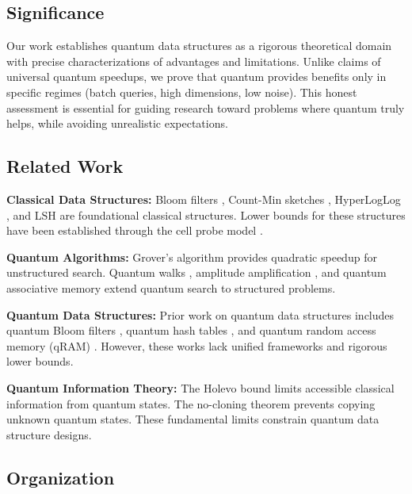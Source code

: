 \documentclass[11pt,letterpaper]{article}
\begin{document}
\subsection{Significance}

Our work establishes quantum data structures as a rigorous theoretical domain with precise characterizations of advantages and limitations. Unlike claims of universal quantum speedups, we prove that quantum provides benefits only in specific regimes (batch queries, high dimensions, low noise). This honest assessment is essential for guiding research toward problems where quantum truly helps, while avoiding unrealistic expectations.

\subsection{Related Work}

\textbf{Classical Data Structures:} Bloom filters \cite{bloom1970space}, Count-Min sketches \cite{cormode2005improved}, HyperLogLog \cite{flajolet2007hyperloglog}, and LSH \cite{indyk1998approximate} are foundational classical structures. Lower bounds for these structures have been established through the cell probe model \cite{yao1981should,patrascu2008lower}.

\textbf{Quantum Algorithms:} Grover's algorithm \cite{grover1996fast} provides quadratic speedup for unstructured search. Quantum walks \cite{ambainis2007quantum}, amplitude amplification \cite{brassard2002quantum}, and quantum associative memory \cite{giovannetti2008quantum} extend quantum search to structured problems.

\textbf{Quantum Data Structures:} Prior work on quantum data structures includes quantum Bloom filters \cite{bravyi2003classical}, quantum hash tables \cite{ambainis2008quantum}, and quantum random access memory (qRAM) \cite{giovannetti2008quantum}. However, these works lack unified frameworks and rigorous lower bounds.

\textbf{Quantum Information Theory:} The Holevo bound \cite{holevo1973bounds} limits accessible classical information from quantum states. The no-cloning theorem \cite{wootters1982single} prevents copying unknown quantum states. These fundamental limits constrain quantum data structure designs.

\subsection{Organization}
\end{document}
